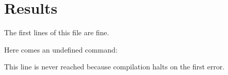 \section{Results}
The first lines of this file are fine.

Here comes an undefined command:

This line is never reached because compilation halts on the first error.
